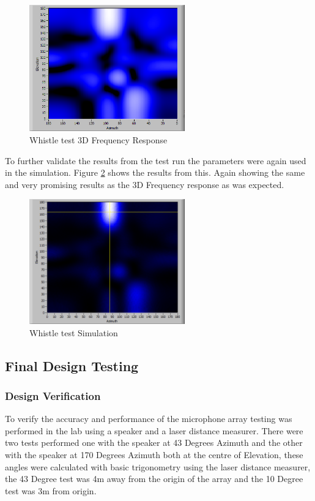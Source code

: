 \documentclass{UoNMCHA}
\numberwithin{equation}{section}
\begin{document}
    \begin{figure} [H]
        \centering
        \includegraphics[keepaspectratio, width = 0.6\textwidth]{Figures/RealWhistle3DFreqResp.png}
        \caption{Whistle test 3D Frequency Response}
        \label{fig:RealWhistleFreq}
    \end{figure}
    
    To further validate the results from the test run the parameters were again used in the simulation. Figure \ref{fig:RealWhistleSim} shows the results from this. Again showing the same and very promising results as the 3D Frequency response as was expected.
    
     \begin{figure} [H]
        \centering
        \includegraphics[keepaspectratio, width = 0.6\textwidth]{Figures/RealWhistleSim.png}
        \caption{Whistle test Simulation}
        \label{fig:RealWhistleSim}
    \end{figure}
    
\subsection{Final Design Testing} \label{sec:Second Array Testing}
\subsubsection{Design Verification} \label{sec:Design Verification Testing}
    To verify the accuracy and performance of the microphone array testing was performed in the lab using a speaker and a laser distance measurer. There were two tests performed one with the speaker at 43 Degrees Azimuth and the other with the speaker at 170 Degrees Azimuth both at the centre of Elevation, these angles were calculated with basic trigonometry using the laser distance measurer, the 43 Degree test was 4m away from the origin of the array and the 10 Degree test was 3m from origin.
    
\end{document}
